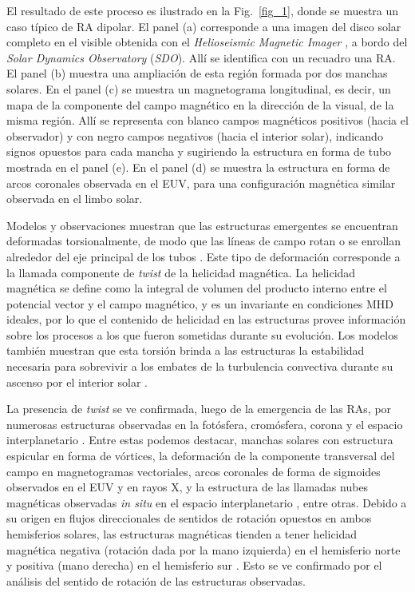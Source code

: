 \documentclass[baaa]{baaa}
\begin{document}
El resultado de este proceso es ilustrado en la Fig.~\ref{fig_1}, donde se muestra un caso típico de RA dipolar. El panel (a) corresponde a una imagen del disco solar completo en el visible obtenida con el {\sl Helioseismic Magnetic Imager} \citep[{\sl HMI},][]{scherrer2012}, a bordo del {\sl Solar Dynamics Observatory} ({\sl SDO}). Allí se identifica con un recuadro una RA. El panel (b) muestra una ampliación de esta región formada por dos manchas solares. En el panel (c) se muestra un magnetograma longitudinal, es decir, un mapa de la componente del campo magnético en la dirección de la visual, de la misma región. Allí se representa con blanco campos magnéticos positivos (hacia el observador) y con negro campos negativos (hacia el interior solar), indicando signos opuestos para cada mancha y sugiriendo la estructura en forma de tubo mostrada en el panel (e). En el panel (d) se muestra la estructura en forma de arcos coronales observada en el EUV, para una configuración magnética similar observada en el limbo solar.

Modelos y observaciones muestran que las estructuras emergentes se encuentran deformadas torsionalmente, de modo que las líneas de campo rotan o se enrollan alrededor del eje principal de los tubos \citep{fan2021}. Este tipo de deformación corresponde a la llamada componente de {\sl twist} de la helicidad magnética. La helicidad magnética se define como la integral de volumen del producto interno entre el potencial vector y el campo magnético, y es un invariante en condiciones MHD ideales, por lo que el contenido de helicidad en las estructuras provee información sobre los procesos a los que fueron sometidas durante su evolución. Los modelos también muestran que esta torsión brinda a las estructuras la estabilidad necesaria para sobrevivir a los embates de la turbulencia convectiva durante su ascenso por el interior solar \citep{emonet1998}.

La presencia de {\sl twist} se ve confirmada, luego de la emergencia de las RAs, por numerosas estructuras observadas en la fotósfera, cromósfera, corona y el espacio interplanetario \citep{demoulin2009}. Entre estas podemos destacar, manchas solares con estructura espicular en forma de vórtices, la deformación de la componente transversal del campo en magnetogramas vectoriales, arcos coronales de forma de sigmoides observados en el EUV y en rayos X, y la estructura de las llamadas nubes magnéticas observadas {\sl in situ} en el espacio interplanetario \citep{dasso2009}, entre otras. Debido a su origen en flujos direccionales de sentidos de rotación opuestos en ambos hemisferios solares, las estructuras magnéticas tienden a tener helicidad magnética negativa (rotación dada por la mano izquierda) en el hemisferio norte y positiva (mano derecha) en el hemisferio sur \citep{pevtsov2014}. Esto se ve confirmado por el análisis del sentido de rotación de las estructuras observadas.
\end{document}
